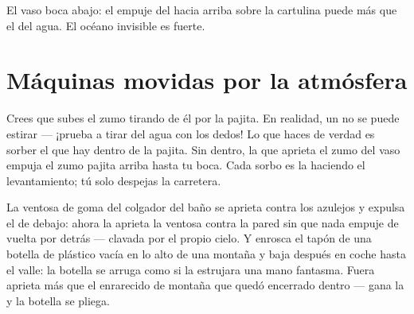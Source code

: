 \begin{omfigure}

{\small El vaso boca abajo: el empuje del  hacia arriba sobre la
cartulina puede más que el  del agua. El océano invisible es
fuerte.}
\end{omfigure}

\section{Máquinas movidas por la atmósfera}

\begin{example}[La pajita]\label{ex:g5:air-pressure-weather:straw}
Crees que subes el zumo tirando de él por la pajita. En realidad, un
 no se puede estirar --- ¡prueba a tirar del agua con los
dedos! Lo que haces de verdad es sorber el \emph{} que hay dentro
de la pajita. Sin  dentro, la  que aprieta el zumo
del vaso empuja el zumo pajita arriba hasta tu boca. Cada sorbo es la
 haciendo el levantamiento; tú solo despejas la carretera.
\end{example}

\begin{example}\label{ex:g5:air-pressure-weather:suction}
La ventosa de goma del colgador del baño se aprieta contra los azulejos
y expulsa el  de debajo: ahora la  aprieta la ventosa
contra la pared sin que nada empuje de vuelta por detrás --- clavada
por el propio cielo. Y enrosca el tapón de una botella de plástico
vacía en lo alto de una montaña y baja después en coche hasta el valle:
la botella se arruga como si la estrujara una mano fantasma. Fuera
aprieta más  que el  enrarecido de montaña que quedó
encerrado dentro --- gana la  y la botella se pliega.
\end{example}

